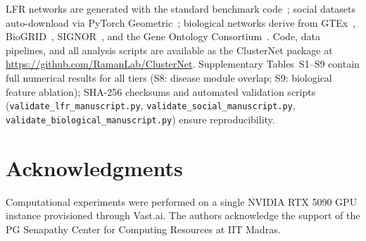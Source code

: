 \documentclass[11pt]{article}
\begin{document}
LFR networks are generated with the standard benchmark code~\citep{andrea_lancichinetti_125b2a5e}; social datasets auto-download via PyTorch Geometric~\citep{fey_pyg_2019}; biological networks derive from GTEx~\citep{gtex_2020}, BioGRID~\citep{biogrid_2023}, SIGNOR~\citep{signor_2020}, and the Gene Ontology Consortium~\citep{gene_ontology_2021}.
Code, data pipelines, and all analysis scripts are available as the ClusterNet package at \url{https://github.com/RamanLab/ClusterNet}.
Supplementary Tables~S1--S9 contain full numerical results for all tiers (S8: disease module overlap; S9: biological feature ablation); SHA-256 checksums and automated validation scripts (\texttt{validate\_lfr\_manuscript.py}, \texttt{validate\_social\_manuscript.py}, \texttt{validate\_biological\_manuscript.py}) ensure reproducibility.

\section*{Acknowledgments}

Computational experiments were performed on a single NVIDIA RTX 5090 GPU instance provisioned through Vast.ai.
The authors acknowledge the support of the PG Senapathy Center for Computing Resources at IIT Madras.


\end{document}
